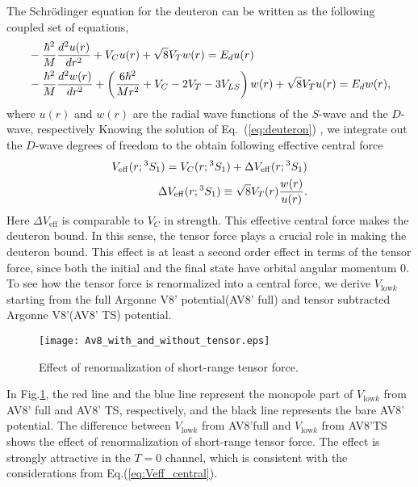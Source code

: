\documentclass[a4paper]{jpconf}
\newcommand\Veff{V_{\mathrm{eff}}}
\newcommand\Vlowk{V_{\mathrm{low}k}}
\newcommand\TSO{{}^3S_1}
\begin{document}
    The Schr\"odinger equation for the  deuteron can be written as the following coupled set of equations,
    \begin{align}
     \label{eq:deuteron}
     &-\frac{\hbar^2}{M}\frac{d^2u(r)}{dr^2}+V_Cu(r)+\sqrt{8}V_T w(r)=E_d u(r)
     \notag \\
     &-\frac{\hbar^2}{M}\frac{d^2w(r)}{dr^2}+\left(\frac{6\hbar^2}{Mr^2} +
     V_C - 2V_T -3V_{LS}\right)w(r)+\sqrt{8}V_T u(r)=E_d w(r),
    \end{align}
    where $u(r)$ and $w(r)$ are the radial wave functions of the $S$-wave and the $D$-wave, respectively
    Knowing the solution of Eq.~(\ref{eq:deuteron}) 
    , we integrate out the $D$-wave degrees of freedom
    to the  obtain following effective central force
    \begin{align}
     {\label{eq:Veff_central}}
     \Veff(r;\TSO) = V_C(r;\TSO) + \Delta \Veff(r;\TSO) \notag \\
     \Delta \Veff(r;\TSO) \equiv \sqrt{8}V_T(r)\frac{w(r)}{u(r)}.
    \end{align} Here
    $\Delta \Veff$ is comparable to $V_C$ in strength.
    This effective central force makes the deuteron bound.
    In this sense, the tensor force plays a crucial role in making the  deuteron
    bound.
    This effect is at least a second order effect in terms of the tensor force,
    since both the initial and the final state have
    orbital angular momentum $0$.
    To see how the tensor force is renormalized into a central force, we derive
    $\Vlowk$ starting from the full Argonne V8' potential(AV8' full) and tensor
    subtracted Argonne V8'(AV8' TS) potential.
    \begin{figure}[h]
     \texttt{[image: Av8\_with\_and\_without\_tensor.eps]}\hspace{2pc}%
     \begin{minipage}[b]{14pc}\caption{\label{fig:ren_ten}Effect of
      renormalization of short-range tensor force.}
     \end{minipage}
    \end{figure}
     In Fig.\ref{fig:ren_ten}, the red line and the blue line
 represent the monopole part of $\Vlowk$ from AV8' full and AV8' TS,
 respectively, and the black line represents the  bare AV8' potential.
 The difference between $\Vlowk$ from AV8'full and $\Vlowk$ from AV8'TS
 shows the effect of renormalization of short-range tensor force.
 The effect is strongly attractive in the $T=0$ channel,
 which is consistent with the considerations from
 Eq.(\ref{eq:Veff_central}).
\end{document}
